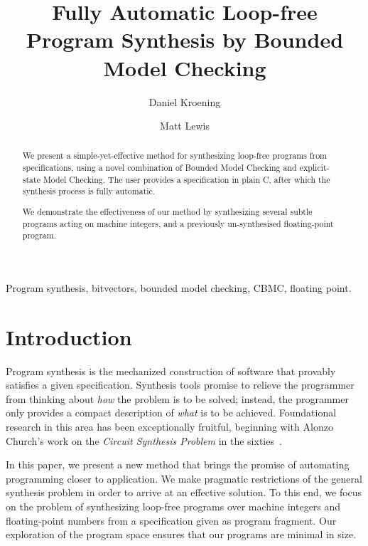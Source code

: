 \documentclass[a4paper]{llncs}
\title{Fully Automatic Loop-free Program Synthesis by Bounded Model Checking}
\author{Daniel Kroening \and Matt Lewis}
\institute{University of Oxford}
\newenvironment{keywords}{
       \list{}{\advance\topsep by0.35cm\relax\small
       \leftmargin=0cm
       \labelwidth=0.35cm
       \listparindent=0.35cm
       \itemindent\listparindent
       \rightmargin\leftmargin}\item[\hskip\labelsep
                                     \bfseries Keywords:]}
     {\endlist}
\begin{document}
%
\maketitle
%
\pagestyle{headings}  %

\begin{abstract}

We present a simple-yet-effective method for synthesizing loop-free programs
from specifications, using a novel combination of Bounded Model Checking and
explicit-state Model Checking.  The user provides a specification in plain
C, after which the synthesis process is fully automatic.

We demonstrate the effectiveness of our method by synthesizing several subtle
programs acting on machine integers, and a previously un-synthesised floating-point program.
\end{abstract}


\begin{keywords}
 Program synthesis, bitvectors, bounded model checking, CBMC,
 floating point.
\end{keywords}

\section{Introduction}

Program synthesis is the mechanized construction of software that provably
satisfies a given specification.  Synthesis tools promise to relieve the
programmer from thinking about \emph{how} the problem is to be solved;
instead, the programmer only provides a compact description of \emph{what}
is to be achieved.  Foundational research in this area has been
exceptionally fruitful, beginning with Alonzo Church's work on the
\emph{Circuit Synthesis Problem} in the sixties~\cite{church-synth}.

In this paper, we present a new method that brings the promise of
automating programming closer to application.  We make pragmatic
restrictions of the general synthesis problem in order to arrive at an
effective solution.  To this end, we focus on the problem of synthesizing
loop-free programs over machine integers and floating-point numbers from a
specification given as program fragment.  Our exploration of the program
space ensures that our programs are minimal in size.
\end{document}

